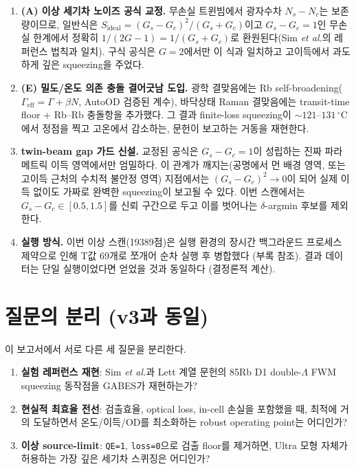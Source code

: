 \documentclass[11pt,a4paper]{article}
\newcommand{\degC}{\,^{\circ}\mathrm{C}}
\begin{document}
\begin{enumerate}[nosep]
\item \textbf{(A) 이상 세기차 노이즈 공식 교정.} 무손실 트윈빔에서 광자수차
      $N_s-N_c$는 보존량이므로, 일반식은
      $S_{\mathrm{ideal}}=(G_s-G_c)^2/(G_s+G_c)$이고 $G_s-G_c=1$인 무손실
      한계에서 정확히 $1/(2G-1)=1/(G_s+G_c)$로 환원된다(Sim \textit{et al.}의
      레퍼런스 법칙과 일치). 구식 공식은 $G=2$에서만 이 식과 일치하고 고이득에서
      과도하게 깊은 squeezing을 주었다.
\item \textbf{(E) 밀도/온도 의존 충돌 결어긋남 도입.} 광학 결맞음에는 Rb
      self-broadening($\Gamma_{\mathrm{eff}}=\Gamma+\beta N$, AutoOD 검증된
      계수), 바닥상태 Raman 결맞음에는 transit-time floor + Rb--Rb 충돌항을
      추가했다. 그 결과 finite-loss squeezing이 $\sim121$--$131\degC$에서
      정점을 찍고 고온에서 감소하는, 문헌이 보고하는 거동을 재현한다.
\item \textbf{twin-beam gap 가드 신설.} 교정된 공식은 $G_s-G_c=1$이 성립하는
      진짜 파라메트릭 이득 영역에서만 엄밀하다. 이 관계가 깨지는(공명에서 먼
      배경 영역, 또는 고이득 근처의 수치적 불안정 영역) 지점에서는
      $(G_s-G_c)^2\to0$이 되어 실제 이득 없이도 가짜로 완벽한 squeezing이
      보고될 수 있다. 이번 스캔에서는 $G_s-G_c\in[0.5,1.5]$를 신뢰 구간으로 두고
      이를 벗어나는 $\delta$-argmin 후보를 제외한다.
\item \textbf{실행 방식.} 이번 이상 스캔(19389점)은 실행 환경의 장시간
      백그라운드 프로세스 제약으로 인해 T값 69개로 쪼개어 순차 실행 후 병합했다
      (부록 참조). 결과 데이터는 단일 실행이었다면 얻었을 것과 동일하다
      (결정론적 계산).
\end{enumerate}

\section{질문의 분리 (v3과 동일)}
이 보고서에서 서로 다른 세 질문을 분리한다.

\begin{enumerate}[nosep]
\item \textbf{실험 레퍼런스 재현}: Sim \textit{et al.}과 Lett 계열 문헌의 85Rb D1
      double-$\Lambda$ FWM squeezing 동작점을 GABES가 재현하는가?
\item \textbf{현실적 최효율 전선}: 검출효율, optical loss, in-cell 손실을 포함했을 때,
      최적에 거의 도달하면서 온도/이득/OD를 최소화하는 robust operating point는 어디인가?
\item \textbf{이상 source-limit}: \texttt{QE=1}, \texttt{loss=0}으로 검출 floor를 제거하면,
      Ultra 모형 자체가 허용하는 가장 깊은 세기차 스퀴징은 어디인가?
\end{enumerate}
\end{document}
